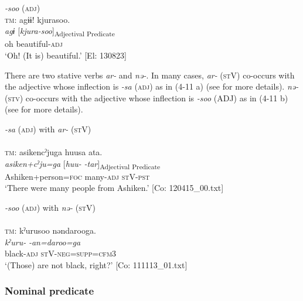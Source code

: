   \ex \textit{{}-soo} (\textsc{adj})\\
\glll  \textsc{tm}:  agɨɨ!  kjurasoo.\\
    \textit{agɨ}  [\textit{kjura-soo}]\textsubscript{Adjectival Predicate}\\
    oh  beautiful-\textsc{adj}\\
    \glt     ‘Oh! (It is) beautiful.’ [El: 130823]
    \z
\z

  There are two stative verbs \textit{ar-} and \textit{nə-}. In many cases, \textit{ar-} (\textsc{st}V) co-occurs with the adjective whose inflection is \textit{{}-sa} (\textsc{adj}) as in (4-11 a) (see  for more details). \textit{nə-} (\textsc{stv}) co-occurs with the adjective whose inflection is \textit{{}-soo} (ADJ) as in (4-11 b) (see  for more details).

\ea  \label{ex:4.11}
 \ea \textit{{}-sa} (\textsc{adj}) with \textit{ar-} (\textsc{st}V) \label{ex:4.11a}\\\\
\glll  \textsc{tm}:  asikencˀjuga  huusa  ata.\\
    \textit{asiken+cˀju=ga}  [\textit{huu-}  \textit{-tar}]\textsubscript{Adjectival Predicate}\\
    Ashiken+person=\textsc{foc}  many-\textsc{adj}  \textsc{st}V-\textsc{pst}\\
    \glt     ‘There were many people from Ashiken.’ [Co: 120415\_00.txt]

 \ex\textit{{}-soo} (\textsc{adj}) with \textit{nə-} (\textsc{st}V)\\\\
\glll  \textsc{tm}:  kˀurusoo  nəndarooga.\\
    \textit{kˀuru-}  \textit{-an=daroo=ga}\\
    black-\textsc{adj}  \textsc{st}V-\textsc{neg}=\textsc{supp}=\textsc{cfm}3\\
    \glt     ‘(Those) are not black, right?’ [Co: 111113\_01.txt]
    \z
\z

\subsubsection{Nominal predicate}\label{sec:4.1.3.3}


